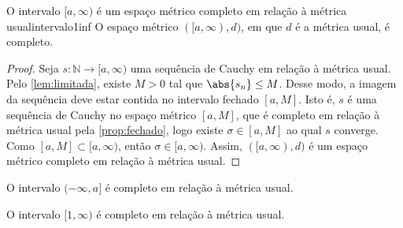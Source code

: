 \begin{proposition}{O intervalo \([a,\infty)\) é um espaço métrico completo em relação à métrica usual}{intervalo1inf}
    O espaço métrico \(([a,\infty), d)\), em que \(d\) é a métrica usual, é completo.
\end{proposition}
\begin{proof}
    Seja \(s : \mathbb{N} \to [a,\infty)\) uma sequência de Cauchy em relação à métrica usual. Pelo \cref{lem:limitada}, existe \(M > 0\) tal que \(\abs{s_n} \leq M\). Desse modo, a imagem da sequência deve estar contida no intervalo fechado \([a, M]\). Isto é, \(s\) é uma sequência de Cauchy no espaço métrico \([a, M]\), que é completo em relação à métrica usual pela \cref{prop:fechado}, logo existe \(\sigma \in [a,M]\) ao qual \(s\) converge. Como \([a, M] \subset [a, \infty)\), então \(\sigma \in [a, \infty)\). Assim, \(([a,\infty), d)\) é um espaço métrico completo em relação à métrica usual.
\end{proof}
\begin{corollary}
    O intervalo \((-\infty, a]\) é completo em relação à métrica usual.
\end{corollary}
\begin{corollary}
    O intervalo \([1, \infty)\) é completo em relação à métrica usual.
\end{corollary}

